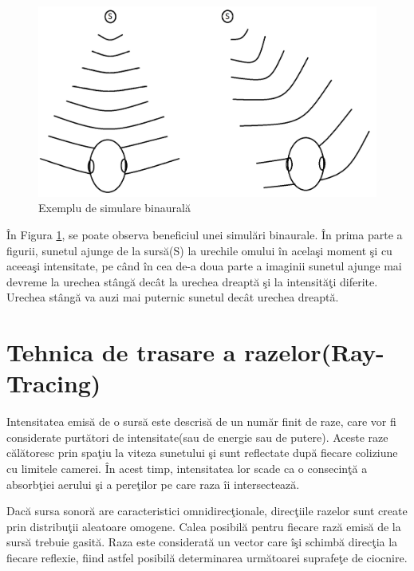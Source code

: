 	\begin{figure}[!htb]
		\centering
		\includegraphics[width=12cm]{imagini/binauralExample.png}
		\caption{Exemplu de simulare binaural\u{a}}
		\label{Fig12}
	\end{figure}

	\^{I}n Figura \ref{Fig12}, se poate observa beneficiul unei simul\u{a}ri binaurale. \^{I}n prima parte a figurii, sunetul ajunge de la surs\u{a}(S) la urechile omului \^{i}n acela\c{s}i moment \c{s}i cu aceea\c{s}i intensitate, pe c\^{a}nd \^{i}n cea de-a doua parte a imaginii sunetul ajunge mai devreme la urechea st\^{a}ng\u{a} dec\^{a}t la urechea dreapt\u{a} \c{s}i la intensit\u{a}\c{t}i diferite. Urechea st\^{a}ng\u{a} va auzi mai puternic sunetul dec\^{a}t urechea dreapt\u{a}. 

	\section{Tehnica de trasare a razelor(Ray-Tracing)}
	
	Intensitatea emis\u{a} de o surs\u{a} este descris\u{a} de un num\u{a}r finit de raze, care vor fi considerate purt\u{a}tori de intensitate(sau de energie sau de putere). Aceste raze c\u{a}l\u{a}toresc prin spa\c{t}iu la viteza sunetului \c{s}i sunt reflectate dup\u{a} fiecare coliziune cu limitele camerei. \^{I}n acest timp, intensitatea lor scade ca o consecin\c{t}\u{a} a absorb\c{t}iei aerului \c{s}i a pere\c{t}ilor pe care raza \^{i}i intersecteaz\u{a}.
	\bigskip
	
	Dac\u{a} sursa sonor\u{a} are caracteristici omnidirec\c{t}ionale, direc\c{t}iile razelor sunt create prin distribu\c{t}ii aleatoare omogene. Calea posibil\u{a} pentru fiecare raz\u{a} emis\u{a} de la surs\u{a} trebuie gasit\u{a}. Raza este considerat\u{a} un vector care \^{i}\c{s}i schimb\u{a} direc\c{t}ia la fiecare reflexie, fiind astfel posibil\u{a} determinarea urm\u{a}toarei suprafe\c{t}e de ciocnire. 
	\bigskip
	
